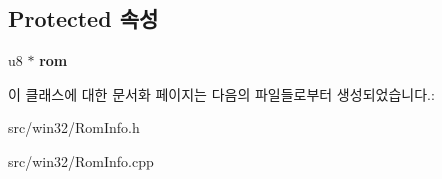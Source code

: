 \subsection*{Protected 속성}
\begin{DoxyCompactItemize}
\item 
\mbox{\label{class_rom_info_g_b_ab7ac87e9a9566fce1f057d7c37f60770}} 
u8 $\ast$ {\bfseries rom}
\end{DoxyCompactItemize}


이 클래스에 대한 문서화 페이지는 다음의 파일들로부터 생성되었습니다.\+:\begin{DoxyCompactItemize}
\item 
src/win32/Rom\+Info.\+h\item 
src/win32/Rom\+Info.\+cpp\end{DoxyCompactItemize}
